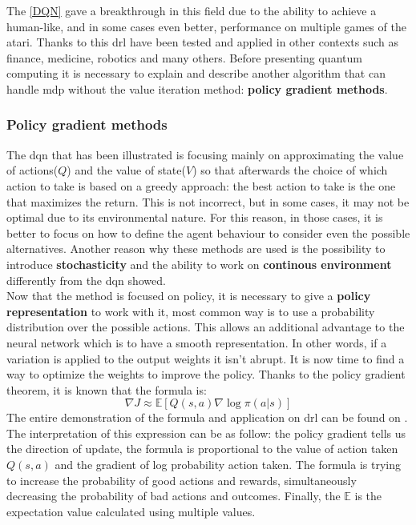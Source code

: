 The \ref{DQN} gave a breakthrough in this field due to the ability to achieve a human-like, and in some cases even better, performance on multiple games of the atari. Thanks to this \acrlong{drl} have been tested and applied in other contexts such as finance, medicine, robotics and many others. Before presenting quantum computing it is necessary to explain and describe another algorithm that can handle \acrlong{mdp} without the value iteration method: \textbf{policy gradient methods}.
\subsubsection{Policy gradient methods}
The \acrshort{dqn} that has been illustrated is focusing mainly on approximating the value of actions($Q$) and the value of state($V$) so that afterwards the choice of which action to take is based on a greedy approach: the best action to take is the one that maximizes the return. This is not incorrect, but in some cases, it may not be optimal due to its environmental nature. For this reason, in those cases, it is better to focus on how to define the agent behaviour to consider even the possible alternatives. Another reason why these methods are used is the possibility to introduce \textbf{stochasticity} and the ability to work on \textbf{continous environment} differently from the \acrshort{dqn} showed.\\
Now that the method is focused on policy, it is necessary to give a \textbf{policy representation} to work with it, most common way is to use a probability distribution over the possible actions. This allows an additional advantage to the neural network which is to have a smooth representation. In other words, if a variation is applied to the output weights it isn't abrupt.
It is now time to find a way to optimize the weights to improve the policy. Thanks to the policy gradient theorem, it is known that the formula is:
\begin{equation}\label{policy_grad_theorem}
	\nabla J \approx \mathbb{E}[Q(s,a) \nabla \log \pi(a|s)]
\end{equation}
The entire demonstration of the formula and application on \acrlong{drl} can be found on \cite{10.5555/3009657.3009806}. The interpretation of this expression can be as follow: the policy gradient tells us the direction of update, the formula is proportional to the value of action taken $Q(s, a)$ and the gradient of log probability action taken. The formula is trying to increase the probability of good actions and rewards, simultaneously decreasing the probability of bad actions and outcomes. Finally, the $\mathbb{E}$ is the expectation value calculated using multiple values.\\		
